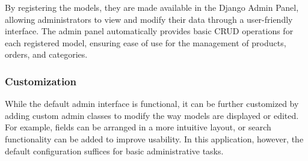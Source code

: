 By registering the models, they are made available in the Django Admin Panel, allowing administrators to view and modify their data through a user-friendly interface. The admin panel automatically provides basic CRUD operations for each registered model, ensuring ease of use for the management of products, orders, and categories.

\subsubsection{Customization}
While the default admin interface is functional, it can be further customized by adding custom admin classes to modify the way models are displayed or edited. For example, fields can be arranged in a more intuitive layout, or search functionality can be added to improve usability. In this application, however, the default configuration suffices for basic administrative tasks.


